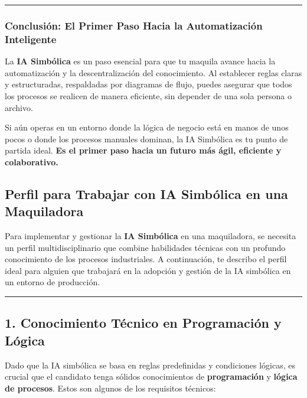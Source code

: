 \documentclass[
  10pt,
  letterpaper,
]{book}
\begin{document}
\begin{center}\rule{0.5\linewidth}{0.5pt}\end{center}

\subsubsection{Conclusión: El Primer Paso Hacia la Automatización
Inteligente}\label{conclusiuxf3n-el-primer-paso-hacia-la-automatizaciuxf3n-inteligente}

La \textbf{IA Simbólica} es un paso esencial para que tu maquila avance
hacia la automatización y la descentralización del conocimiento. Al
establecer reglas claras y estructuradas, respaldadas por diagramas de
flujo, puedes asegurar que todos los procesos se realicen de manera
eficiente, sin depender de una sola persona o archivo.

Si aún operas en un entorno donde la lógica de negocio está en manos de
unos pocos o donde los procesos manuales dominan, la IA Simbólica es tu
punto de partida ideal. \textbf{Es el primer paso hacia un futuro más
ágil, eficiente y colaborativo.}

\subsection{Perfil para Trabajar con IA Simbólica en una
Maquiladora}\label{perfil-para-trabajar-con-ia-simbuxf3lica-en-una-maquiladora}

Para implementar y gestionar la \textbf{IA Simbólica} en una
maquiladora, se necesita un perfil multidisciplinario que combine
habilidades técnicas con un profundo conocimiento de los procesos
industriales. A continuación, te describo el perfil ideal para alguien
que trabajará en la adopción y gestión de la IA simbólica en un entorno
de producción.

\begin{center}\rule{0.5\linewidth}{0.5pt}\end{center}

\subsection{\texorpdfstring{\textbf{1. Conocimiento Técnico en
Programación y
Lógica}}{1. Conocimiento Técnico en Programación y Lógica}}\label{conocimiento-tuxe9cnico-en-programaciuxf3n-y-luxf3gica}

Dado que la IA simbólica se basa en reglas predefinidas y condiciones
lógicas, es crucial que el candidato tenga sólidos conocimientos de
\textbf{programación} y \textbf{lógica de procesos}. Estos son algunos
de los requisitos técnicos:
\end{document}
